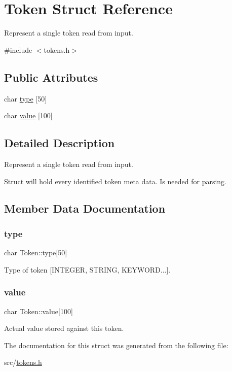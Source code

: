 \hypertarget{struct_token}{}\section{Token Struct Reference}
\label{struct_token}


Represent a single token read from input.  




{\ttfamily \#include $<$tokens.\+h$>$}

\subsection*{Public Attributes}
\begin{DoxyCompactItemize}
\item 
char \mbox{\hyperlink{struct_token_a603b16a5f61141f741fdfbf70d27cbe9}{type}} \mbox{[}50\mbox{]}
\item 
char \mbox{\hyperlink{struct_token_ae3a20bd709dc24779b6dfcc5e6eb932d}{value}} \mbox{[}100\mbox{]}
\end{DoxyCompactItemize}


\subsection{Detailed Description}
Represent a single token read from input. 

Struct will hold every identified token meta data. Is needed for parsing. 

\subsection{Member Data Documentation}
\mbox{\label{struct_token_a603b16a5f61141f741fdfbf70d27cbe9}} 
\subsubsection{\texorpdfstring{type}{type}}
{\footnotesize\ttfamily char Token\+::type\mbox{[}50\mbox{]}}

Type of token \mbox{[}I\+N\+T\+E\+G\+ER, S\+T\+R\+I\+NG, K\+E\+Y\+W\+O\+RD...\mbox{]}. \mbox{\label{struct_token_ae3a20bd709dc24779b6dfcc5e6eb932d}} 
\subsubsection{\texorpdfstring{value}{value}}
{\footnotesize\ttfamily char Token\+::value\mbox{[}100\mbox{]}}

Actual value stored against this token. 

The documentation for this struct was generated from the following file\+:\begin{DoxyCompactItemize}
\item 
src/\mbox{\hyperlink{tokens_8h}{tokens.\+h}}\end{DoxyCompactItemize}
